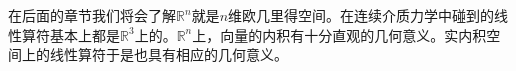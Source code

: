 \documentclass[main.tex]{subfiles}
\begin{document}
在后面的章节我们将会了解$\mathbb{R}^n$就是$n$维欧几里得空间。在连续介质力学中碰到的线性算符基本上都是$\mathbb{R}^3$上的。$\mathbb{R}^n$上，向量的内积有十分直观的几何意义。实内积空间上的线性算符于是也具有相应的几何意义。
\end{document}
